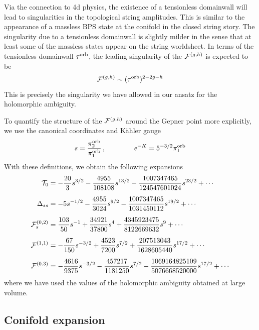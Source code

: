 Via the connection to 4d physics, the existence of a tensionless domainwall 
will lead to singularities in the topological string amplitudes.
This is similar to the appearance of a massless BPS state at the conifold
in the closed string story. The singularity due to a tensionless domainwall
is slightly milder in the sense that at least some of the massless
states appear on the string worldsheet.
In terms of the tensionless domainwall $\tau^{\rm orb}$, the leading singularity 
of the ${{\cal F}}^{(g,h)}$ is expected to be
\begin{equation}
{{\cal F}}^{(g,h)} \sim (\tau^{\rm orb})^{2-2g-h}
\end{equation}
This is precisely the singularity we have allowed in our ansatz for the
holomorphic ambiguity.

To quantify the structure of the ${{\cal F}}^{(g,h)}$ around the Gepner point more
explicitly, we use the canonical coordinates and K\"ahler gauge \cite{hkq}
\begin{equation}
s = \frac{\pi^{\rm orb}_2}{\pi^{\rm orb}_1} \,,\qquad\qquad
{\it e}^{-K} = 5^{-3/2} \pi^{\rm orb}_1
\end{equation}
With these definitions, we obtain the following expansions
\begin{equation}
\eqlabel{gepnerexp}
\begin{split}
\calt_0 &= -\frac{20}{3} s^{3/2} -\frac{4955}{108108} s^{13/2}
-\frac{1007347465}{124547601024} s^{23/2} + \cdots \\[.2cm]
\Delta_{ss} &=   
- 5s^{-1/2} - \frac{4955}{3024}s^{9/2} - 
\frac {1007347465} {1031450112} s^{19/2} + \cdots \\[.2cm]
\F 02_s &=
\frac {103} {50}s^{-1} + \frac {34921} {37800}s^4 + 
\frac {4345923475} {8122669632} s^9 + \cdots \\[.2cm]
\F 11 &= -\frac{67}{150}s^{-3/2} + \frac {4523}{7200} s^{7/2}+ 
\frac {207513043}{1628605440} s^{17/2} + \cdots \\[.2cm]
\F 03 &= -\frac {4616} {9375} s^{-3/2} - \frac {457217} {1181250}s^{7/2} - 
\frac {1069164825109} {5076668520000}s^{17/2} +\cdots
\end{split}
\end{equation}
where we have used the values of the holomorphic ambiguity obtained at
large volume. 


\subsection{Conifold expansion}

